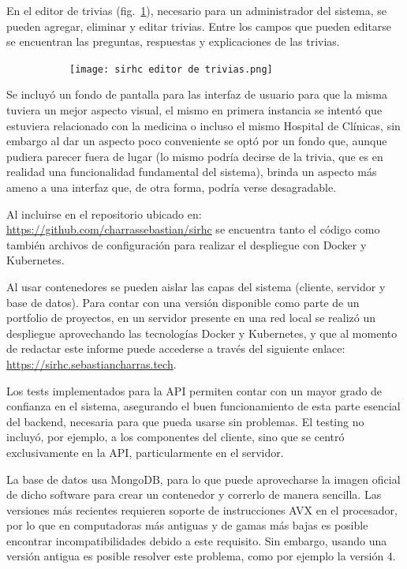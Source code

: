 \documentclass{article}
\begin{document}
En el editor de trivias (fig.~\ref{fig:editorTrivias}), necesario para un administrador del sistema, se pueden agregar, eliminar y editar trivias. Entre los campos que pueden editarse se encuentran las preguntas, respuestas y explicaciones de las trivias.
\begin{figure}[H]
	\caption{Editor de trivias}
    \begin{subfigure}{1\textwidth}
	\texttt{[image: sirhc editor de trivias.png]}
    \end{subfigure}
	\label{fig:editorTrivias}
\end{figure}
\vspace{-1.0\baselineskip}
Se incluyó un fondo de pantalla para las interfaz de usuario para que la misma tuviera un mejor aspecto visual, el mismo en primera instancia se intentó que estuviera relacionado con la medicina o incluso el mismo Hospital de Clínicas, sin embargo al dar un aspecto poco conveniente se optó por un fondo que, aunque pudiera parecer fuera de lugar (lo mismo podría decirse de la trivia, que es en realidad una funcionalidad fundamental del sistema), brinda un aspecto más ameno a una interfaz que, de otra forma, podría verse desagradable.

Al incluirse en el repositorio ubicado en: \href{https://github.com/charrassebastian/sirhc}{https://github.com/charrassebastian/sirhc} se encuentra tanto el código como también archivos de configuración para realizar el despliegue con Docker y Kubernetes.

Al usar contenedores se pueden aislar las capas del sistema (cliente, servidor y base de datos). Para contar con una versión disponible como parte de un portfolio de proyectos, en un servidor presente en una red local se realizó un despliegue aprovechando las tecnologías Docker y Kubernetes, y que al momento de redactar este informe puede accederse a través del siguiente enlace: \href{https://sirhc.sebastiancharras.tech}{https://sirhc.sebastiancharras.tech}.

Los tests implementados para la API permiten contar con un mayor grado de confianza en el sistema, asegurando el buen funcionamiento de esta parte esencial del backend, necesaria para que pueda usarse sin problemas. El testing no incluyó, por ejemplo, a los componentes del cliente, sino que se centró exclusivamente en la API, particularmente en el servidor.

La base de datos usa MongoDB, para lo que puede aprovecharse la imagen oficial de dicho software para crear un contenedor y correrlo de manera sencilla. Las versiones más recientes requieren soporte de instrucciones AVX en el procesador, por lo que en computadoras más antiguas y de gamas más bajas es posible encontrar incompatibilidades debido a este requisito. Sin embargo, usando una versión antigua es posible resolver este problema, como por ejemplo la versión 4.
\newpage
\end{document}
